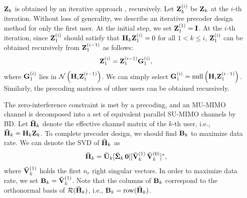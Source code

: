 \documentclass[journal,twoside]{IEEEtranTCOM}
\begin{document}
%

${\bf{Z}}_k$ is obtained by an iterative approach \cite{SRN}, recursively. Let ${\bf{Z}}_k^{(i)}$ be ${\bf{Z}}_k$ at the $i$-th iteration. Without loss of generality, we describe an iterative precoder design method for only the first user. At the initial step, we set ${\bf{Z}}^{(1)}_1=\bf{I}$. At the $i$-th iteration, since ${\bf{Z}}^{(i)}_1$ should satisfy that ${{\bf{H}}_k}{\bf{Z}}^{(i)}_1=0$ for all $1 < k \leq i$, ${\bf{Z}}^{(i)}_1$ can be obtained recursively from ${\bf{Z}}^{(i-1)}_1$ as follows:
\begin{equation}
{\bf{Z}}^{(i)}_1={\bf{Z}}^{(i-1)}_1 {{\bf{G}}_1^{(i)}},
\end{equation}
where ${{\bf{G}}_1^{(i)}}$ lies in ${\cal{N}}\left({\bf{H}}_{i}{\bf{Z}}^{(i-1)}_1\right)$. We can simply select ${\bf{G}}_1^{(i)}=\mathrm{null}\left({\bf{H}}_{i}{\bf{Z}}^{(i-1)}_1\right)$. Similarly, the precoding matrices of other users can be obtained recursively. %

The zero-interference constraint is met by a precoding, and an MU-MIMO channel is decomposed into a set of equivalent parallel SU-MIMO channels by BD. Let ${\bf{\bar H}}_k$ denote the effective channel matrix of the $k$-th user, i.e., ${{{\bf{\bar H}}}_k} = {{\bf{H}}_k}{{\bf{Z}}_k}$. To complete precoder design, we should find ${{\bf{B}}_k}$ to maximize data rate. We can denote the SVD of ${{{\bf{\bar H}}}_k}$ as
\begin{equation}
{{{\bf{\bar H}}}_k}={{{\bf{\bar U}}}_k}[{{\bf{\bar \Sigma}}_k} \,  {\bf{0}}] {[{\bf{\bar V}}_k^{(1)} \, {\bf{\bar V}}_k^{(0)}]^*},
\end{equation}
where ${{{\bf{\bar V}}}^{(1)}_k}$ holds the first $n_r$ right singular vectors. In order to maximize data rate, we set ${{\bf{B}}_k}={{{\bf{\bar V}}}^{(1)}_k}$. Note that the columns of ${{\bf{B}}_k}$ correspond to the orthonormal basis of ${\cal{R}}({{{\bf{\bar H}}}_k})$, i.e., ${{\bf{B}}_k}=\mathrm{row}({{{\bf{\bar H}}}_k})$.
\end{document}
